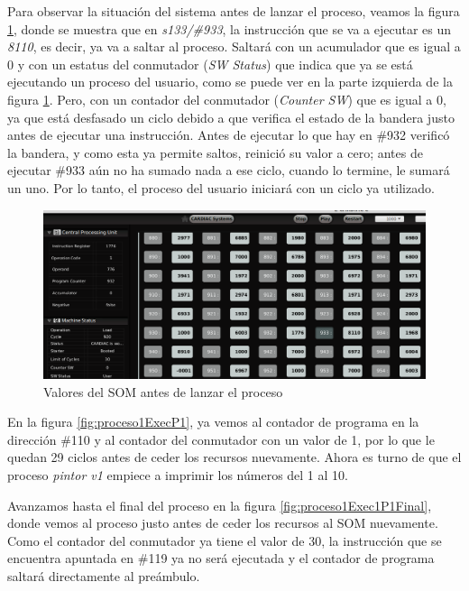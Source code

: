 \documentclass[letterpaper,12pt,oneside]{book}
\begin{document}
		Para observar la situación del sistema antes de lanzar el proceso, veamos la figura \ref{fig:lanzaExec1Prev},
		donde se muestra que en \textit{s133/\#933}, la instrucción que se va a ejecutar es un \textit{8110}, es decir, ya va a saltar al proceso. 
		Saltará con un 
		acumulador que es igual a 0
		y con un estatus del conmutador (\textit{SW Status}) que indica que ya se está ejecutando un proceso del usuario, como se puede
		ver en la parte izquierda de la figura \ref{fig:lanzaExec1Prev}. Pero, con un contador del 
		conmutador (\textit{Counter SW}) que es igual a 0, ya que está desfasado un ciclo debido a que verifica el estado de la bandera justo antes de 
		ejecutar una instrucción. Antes de ejecutar lo que hay
		en \#932 verificó la bandera, y como esta ya permite saltos, reinició su valor a cero; antes de ejecutar  \#933 aún no ha sumado nada a ese 
		ciclo, cuando lo termine, le 
		sumará un uno. Por lo tanto, el proceso del usuario iniciará con un ciclo ya utilizado.
	


				
		

		\begin{figure}[h]		
			\centering
			\includegraphics[scale=0.52]{media/CARDIACC/LanzamientoExec1Prev.png}
			\caption{ Valores del SOM antes de lanzar el proceso}
			\label{fig:lanzaExec1Prev}
		\end{figure}		
		
		En la figura \ref{fig:proceso1ExecP1}, ya vemos al contador de programa en la dirección \#110 y al contador del conmutador
		con un valor de 1, por lo que le quedan 29 
		ciclos antes 
		de ceder los recursos nuevamente. 
		Ahora es turno de que el proceso \textit{pintor v1} empiece a imprimir los números del 1 al 10. 
		
		Avanzamos hasta el final del proceso en la figura
		\ref{fig:proceso1Exec1P1Final}, donde vemos al proceso justo antes de ceder los recursos al SOM nuevamente. Como el contador del conmutador ya tiene el 
		valor de 30, la instrucción que se encuentra apuntada
		en \#119 ya no será ejecutada y el contador de programa saltará directamente al preámbulo.
  
\end{document}
